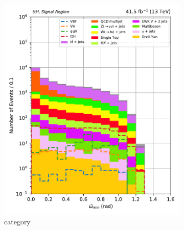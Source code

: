 \begin{figure}[htbp]
    \centering
    \begin{subfigure}[b]{0.27\textwidth}
        \includegraphics[width=\textwidth]{figures/category_optimisations/with_mindphi_cut/min_omega_tilde_ttH.pdf}
        \caption{\ttH category}
    \end{subfigure}
    \hfill
    \begin{subfigure}[b]{0.27\textwidth}

\end{subfigure}
\end{figure}

